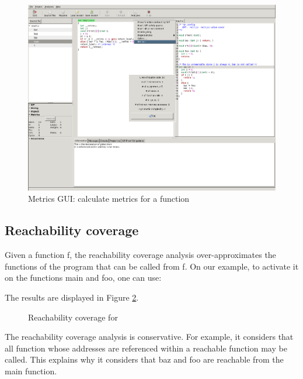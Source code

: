 \documentclass{frama-c-book}
\begin{document}
\begin{figure}[!ht]
  \centering
  \includegraphics[width=\linewidth]{img/metrics_gui_function.png}
  \caption{Metrics GUI: calculate metrics for a function}
  \label{fig:gui_function}
\end{figure}


\subsection{Reachability coverage}
\label{sec:analysis-cover}

Given a function {\sf f}, the reachability coverage analysis over-approximates
the functions of the program that can be called from {\sf f}.
On our example, to activate it on the functions {\sf main} and {\sf foo},
one can use:
\begin{shell}[escapechar={\#}]
\end{shell}

The results are displayed in Figure \ref{fig:reach_cover}.
\begin{figure}[!ht]
  \centering
  
  \caption{Reachability coverage for \pgname}
  \label{fig:reach_cover}
\end{figure}
The reachability coverage analysis is conservative. For example, it
considers that all function whose addresses are referenced within a
reachable function may be called. This explains why it considers that {\sf baz}
and {\sf foo} are reachable from the {\sf main} function.
\end{document}
